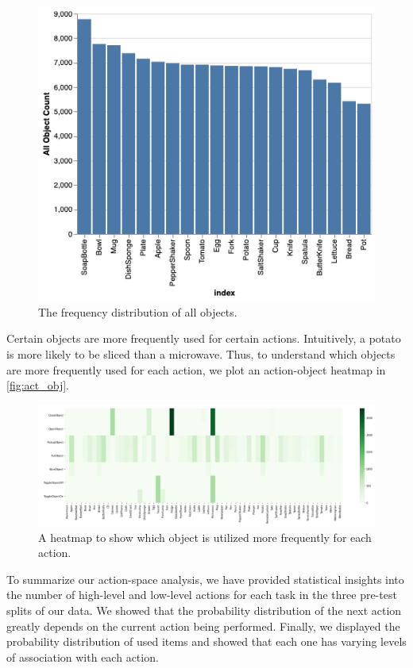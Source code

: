 \documentclass[11pt,a4paper]{article}
\begin{document}
\begin{figure}
    \centering
    \includegraphics[width=\linewidth]{Reports/1-Task-Definition-and-Data/all_obj.png}
    \caption{The frequency distribution of all objects.}
    \label{fig:all_obj}
\end{figure}

Certain objects are more frequently used for certain actions. Intuitively, a potato is more likely to be sliced than a microwave. Thus, to understand which objects are more frequently used for each action, we plot an action-object heatmap in \autoref{fig:act_obj}.

\begin{figure}
    \centering
    \includegraphics[width=\linewidth]{Reports/1-Task-Definition-and-Data/act_obj.png}
    \caption{A heatmap to show which object is utilized more frequently for each action.}
    \label{fig:act_obj}
\end{figure}

To summarize our action-space analysis, we have provided statistical insights into the number of high-level and low-level actions for each task in the three pre-test splits of our data. We showed that the probability distribution of the next action greatly depends on the current action being performed. Finally, we displayed the probability distribution of used items and showed that each one has varying levels of association with each action.
\end{document}
